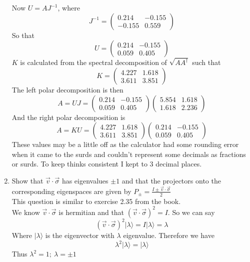 \documentclass[12pt]{article}
\newcommand{\ket}[1]{\vert{#1}\rangle}
\begin{document}
\begin{enumerate}
Now $U = AJ^{-1} $, where 
$$J^{-1} = \left( \begin{array}{cc} 0.214 & -0.155 \\ -0.155 & 0.559 \end{array} \right) $$ 
So that 
$$ U = \left( \begin{array}{cc} 0.214 & -0.155 \\ 0.059 & 0.405 \end{array} \right) $$ 
$K$ is calculated from the spectral decomposition of $\sqrt{AA^\dagger}$  such that
$$ K = \left( \begin{array}{cc} 4.227 & 1.618 \\ 3.611 & 3.851 \end{array} \right) $$ 
The left polar decomposition is then 
$$ A = UJ = \left( \begin{array}{cc} 0.214 & -0.155 \\ 0.059 & 0.405 \end{array} \right) \left( \begin{array}{cc} 5.854 & 1.618 \\ 1.618 & 2.236 \end{array} \right) $$
And the right polar decomposition is 
$$ A = KU = \left( \begin{array}{cc} 4.227 & 1.618 \\ 3.611 & 3.851 \end{array} \right)\left( \begin{array}{cc} 0.214 & -0.155 \\ 0.059 & 0.405 \end{array} \right) $$
These values may be a little off as the calculator had some rounding error when it came to the surds and couldn't represent some decimals as fractions or surds. To keep thinks consistent I kept to 3 decimal places. 
\item Show that $\vec{v} \cdot \vec{\sigma} $ has eigenvalues $\pm 1$ and that the projectors onto the corresponding eigenspaces are given by $P_{\pm} = \frac{I \pm \vec{v} \cdot \vec{\sigma}} {2} $
\\
This question is similar to exercise 2.35 from the book. 
\\
We know $\vec{v} \cdot \vec{\sigma}$ is hermitian and that $(\vec{v} \cdot \vec{\sigma})^2 = I$. So we can say
$$ (\vec{v} \cdot \vec{\sigma})^2 \ket{\lambda} = I \ket{\lambda} = \lambda $$
Where $\ket{\lambda}$ is the eigenvector with $\lambda$ eigenvalue. Therefore we have 
$$ \lambda^2 \ket{\lambda} = \ket{\lambda} $$ 
Thus $\lambda^2 =1 ; \ \lambda = \pm 1$

\end{enumerate}
\end{document}
